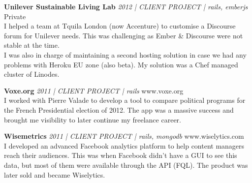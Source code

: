 \documentclass[a4paper]{article}
\begin{document}
{\textbf{Unilever Sustainable Living Lab} \sl 2012 | CLIENT PROJECT | rails, emberjs} \hfill Private\\
I helped a team at Tquila London (now Accenture) to customise a Discourse forum for Unilever needs.
This was challenging as Ember \& Discourse were not stable at the time. \\
I was also in charge of maintaining a second hosting solution in case we had any problems with Heroku EU zone (also beta).
My solution was a Chef managed cluster of Linodes.\\
\vspace*{2mm}

{\textbf{Voxe.org} \sl 2011 | CLIENT PROJECT | rails} \hfill www.voxe.org\\
I worked with Pierre Valade to develop a tool to compare political programs for the French Presidential election of 2012.
The app was a massive success and brought me visibility to later continue my freelance career.\\
\vspace*{2mm}

{\textbf{Wisemetrics} \sl 2011 | CLIENT PROJECT | rails, mongodb} \hfill www.wiselytics.com\\
I developed an advanced Facebook analytics platform to help content managers reach their audiences.
This was when Facebook didn't have a GUI to see this data, but most of them were available through the API (FQL).
The product was later sold and became Wiselytics.\\
\vspace*{2mm}

\vspace*{2mm}
        

\ 
\end{document}
